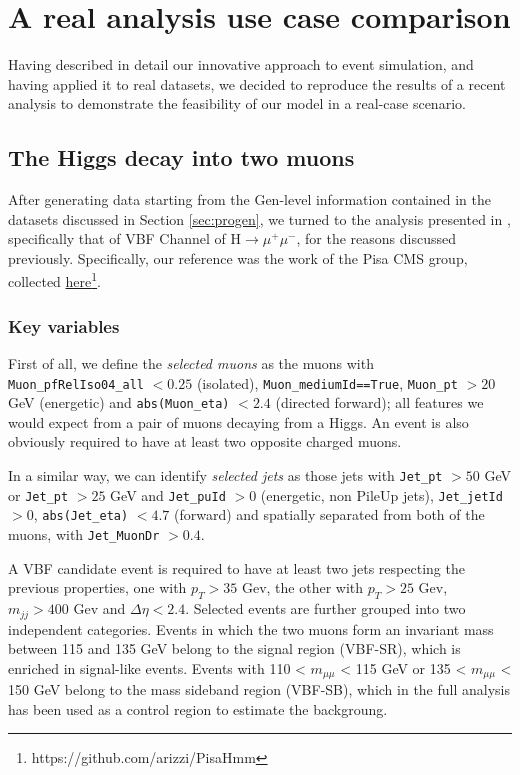 \chapter{A real analysis use case comparison}\label{ch:benan} %
Having described in detail our innovative approach to event simulation, and having applied it to real datasets, we decided to reproduce the results of a recent analysis to demonstrate the feasibility of our model in a real-case scenario.

\section{The Higgs decay into two muons}
After generating data starting from the Gen-level information contained in the datasets discussed in Section \ref{sec:progen}, we turned to the analysis presented in \cite{CMS-PAS-HIG-19-006}, specifically that of VBF Channel of H$\rightarrow\mu^+\mu^-$, for the reasons discussed previously.
Specifically, our reference was the work of the Pisa CMS group, collected \href{https://github.com/arizzi/PisaHmm}{here}\footnote{https://github.com/arizzi/PisaHmm}.

\subsection{Key variables}

First of all, we define the \emph{selected muons} as the muons with\\ \texttt{Muon\_pfRelIso04\_all} $<0.25$ (isolated), \texttt{Muon\_mediumId==True}, \texttt{Muon\_pt} $>20$ GeV (energetic) and \texttt{abs(Muon\_eta)} $<2.4$ (directed forward); all features we would expect from a pair of muons decaying from a Higgs. An event is also obviously required to have at least two opposite charged muons.

In a similar way, we can identify \emph{selected jets} as those jets with \texttt{Jet\_pt} $> 50$ GeV or \texttt{Jet\_pt} $> 25$ GeV and \texttt{Jet\_puId} $>0$ (energetic, non PileUp jets), \texttt{Jet\_jetId} $>0$,  \texttt{abs(Jet\_eta)} $<4.7$ (forward) and spatially separated from both of the muons, with \texttt{Jet\_MuonDr} $>0.4$. 

A VBF candidate event is required to have at least two jets respecting the previous properties, one with $p_T>35$ Gev, the other with $p_T>25$ Gev, $m_{jj}>400$ Gev and $\Delta\eta<2.4$. Selected events are further grouped into two independent categories. Events in which the two muons form an invariant mass between 115 and
135 GeV belong to the signal region (VBF-SR), which is enriched in signal-like events. Events with 110 < $m_{\mu\mu}$ < 115 GeV or 135 < $m_{\mu\mu}$ < 150 GeV belong to the mass sideband region (VBF-SB), which in the full analysis has been used as a control region to estimate the backgroung.

